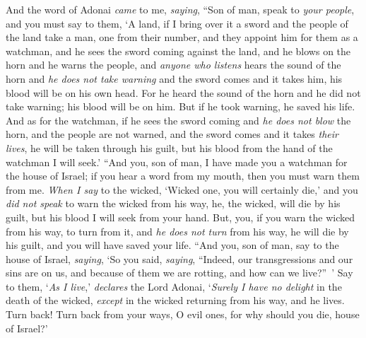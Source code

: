 \begin{biblechapter} %
 And the word of Adonai \textit{came} to me, \textit{saying},
\verse “Son of man, speak to \textit{your people}, and you must say to them, ‘A land, if I bring over it a sword and the people of the land take a man, one from their number, and they appoint him for them as a watchman,
\verse and he sees the sword coming against the land, and he blows on the horn and he warns the people,
\verse and \textit{anyone who listens} hears the sound of the horn and \textit{he does not take warning} and the sword comes and it takes him, his blood will be on his own head.
\verse For he heard the sound of the horn and he did not take warning; his blood will be on him. But if he took warning, he saved his life.
\verse And as for the watchman, if he sees the sword coming and \textit{he does not blow} the horn, and the people are not warned, and the sword comes and it takes \textit{their lives}, he will be taken through his guilt, but his blood from the hand of the watchman I will seek.’
\verse “And you, son of man, I have made you a watchman for the house of Israel; if you hear a word from my mouth, then you must warn them from me.
\verse \textit{When I say} to the wicked, ‘Wicked one, you will certainly die,’ and you \textit{did not speak} to warn the wicked from his way, he, the wicked, will die by his guilt, but his blood I will seek from your hand.
\verse But, you, if you warn the wicked from his way, to turn from it, and \textit{he does not turn} from his way, he will die by his guilt, and you will have saved your life.
\verse “And you, son of man, say to the house of Israel, \textit{saying}, ‘So you said, \textit{saying}, “Indeed, our transgressions and our sins are on us, and because of them we are rotting, and how can we live?” ’
\verse Say to them, ‘\textit{As I live},’ \textit{declares} the Lord Adonai, ‘\textit{Surely I have no delight} in the death of the wicked, \textit{except} in the wicked returning from his way, and he lives. Turn back! Turn back from your ways, O evil ones, for why should you die, house of Israel?’

\end{biblechapter}
